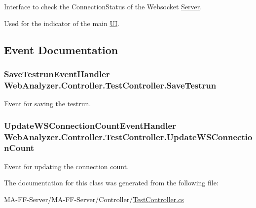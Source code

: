Interface to check the Connection\+Status of the Websocket \hyperlink{namespace_web_analyzer_1_1_server}{Server}. 

Used for the indicator of the main \hyperlink{namespace_web_analyzer_1_1_u_i}{U\+I}. 

\subsection{Event Documentation}
\hypertarget{class_web_analyzer_1_1_controller_1_1_test_controller_a45f8340dcea78391a3f58e5c7996d126}{}
\subsubsection[{Save\+Testrun}]{\setlength{\rightskip}{0pt plus 5cm}Save\+Testrun\+Event\+Handler Web\+Analyzer.\+Controller.\+Test\+Controller.\+Save\+Testrun}\label{class_web_analyzer_1_1_controller_1_1_test_controller_a45f8340dcea78391a3f58e5c7996d126}


Event for saving the testrun. 

\hypertarget{class_web_analyzer_1_1_controller_1_1_test_controller_a3b6d28efa43ed99a2bdf0db062ba46e1}{}
\subsubsection[{Update\+W\+S\+Connection\+Count}]{\setlength{\rightskip}{0pt plus 5cm}Update\+W\+S\+Connection\+Count\+Event\+Handler Web\+Analyzer.\+Controller.\+Test\+Controller.\+Update\+W\+S\+Connection\+Count}\label{class_web_analyzer_1_1_controller_1_1_test_controller_a3b6d28efa43ed99a2bdf0db062ba46e1}


Event for updating the connection count. 



The documentation for this class was generated from the following file\+:\begin{DoxyCompactItemize}
\item 
M\+A-\/\+F\+F-\/\+Server/\+M\+A-\/\+F\+F-\/\+Server/\+Controller/\hyperlink{_test_controller_8cs}{Test\+Controller.\+cs}\end{DoxyCompactItemize}
